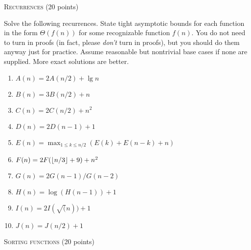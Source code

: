 \documentclass[11pt]{article}
\begin{document}
\begin{problems}
    \item \textsc{Recurrences} \hfill (20 points)

    Solve the following recurrences.  State tight asymptotic bounds
    for each function in the form $\Theta(f(n))$ for some recognizable
    function $f(n)$.  You do not need to turn in proofs (in fact,
    please \emph{don't} turn in proofs), but you should do them anyway
    just for practice.  Assume reasonable but nontrivial base cases if
    none are supplied.  More exact solutions are better.
    \begin{enumerate}
        \item $A(n) = 2A(n/2) + \lg n$
        \item $B(n) = 3B(n/2) + n$
        \item $C(n) = 2C(n/2) + n^2$
        \item  $D(n) = 2D(n-1) + 1$
        \item  $E(n) = \max_{1\le k \le n/2} (E(k) + E(n-k) + n)$
        \item $F(n) = 2F(\lfloor n/3 \rfloor + 9) + n^2$
        \item  $G(n) = 2G(n-1)/G(n-2)$
        \item $H(n) = \log( H(n-1) ) + 1$
        \item $I(n) = 2I(\sqrt(n)) + 1$
        \item  $J(n) = J( { n/2 }) + 1$
    \end{enumerate}

\newpage

    \item \textsc{Sorting functions} \hfill (20 points)


\end{problems}
\end{document}
